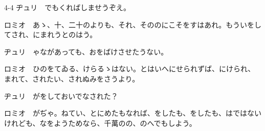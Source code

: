 \documentclass[tate,paper=b6j,jafontsize=9pt]{jlreq}
\begin{document}
\begin{azconvIndented}{4\zw}{-4\zw}
ヂュリ　でもくればしませうぞえ。

ロミオ　あゝ、十、二十のよりも、それ、そののにこそをすはあれ。もういをしてされ、にまれうとのはう。

ヂュリ　ゃながあっても、おをばけさせたうない。

ロミオ　ひのをてゐる、けらるゝはない。とはいへにせられずば、にけられ、まれて、されたい、されぬみをさうより。

ヂュリ　がをしておいでなされた？

ロミオ　がぢゃ。ねてい、とにめたもなれば、をしたも、をしたも、はではないけれども、なをようためなら、千萬のの、のへでもしよう。


\end{azconvIndented}
\end{document}
